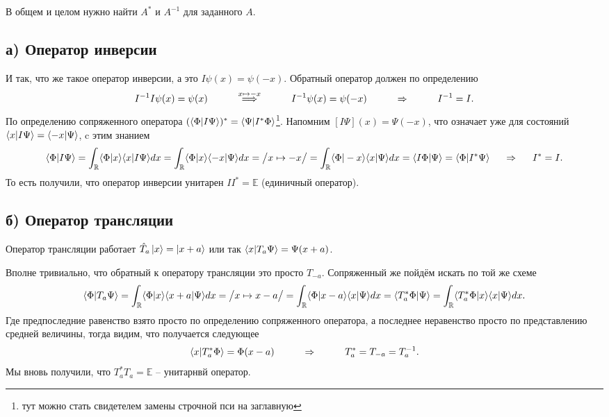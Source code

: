 В общем и целом нужно найти $A^*$ и $A^{-1}$ для заданного $A$. 
\subsection*{а) Оператор инверсии}
И так, что же такое оператор инверсии, а это $I \psi(x) = \psi(-x)$.
Обратный оператор должен по определению
\begin{equation*}
	I^{-1} I \psi(x) = \psi(x)
	\hspace{1 cm}
	\overset{x \mapsto -x}{\Longrightarrow}
	\hspace{1 cm}
	I^{-1} \psi(x) = \psi(-x)
	\hspace{1 cm}
	\Rightarrow
	\hspace{1 cm}
	I^{-1} = I.
\end{equation*}
По определению сопряженного оператора $(\bk{\Phi}{I \Psi})^* = \bk{\Psi}{I^* \Phi}$\footnote{тут можно стать свидетелем замены строчной пси на заглавную}.
Напомним
$[I\Psi](x) = \Psi(-x)$, что означает уже для состояний $\bk{x}{I \Psi} = \bk{- x}{\Psi}$, c этим знанием
\begin{equation*}
	\bk{\Phi}{I \Psi} = \int_{\mathbb{R}} \bk{\Phi}{x} \bk{x}{I \Psi} d x
	=
	\int_{\mathbb{R}} \bk{\Phi}{x}\bk{-x}{\Psi} d x =\big/ x \mapsto - x \big/ =  \int_{\mathbb{R}} \bk{\Phi}{- x}\bk{x}{\Psi} d x
	=
	\bk{I \Phi}{\Psi} = \bk{\Phi}{I^* \Psi}
	\hspace{0.5 cm}
	\Rightarrow
	\hspace{0.5 cm}
	I^{*} = I.
\end{equation*}
То есть получили, что оператор инверсии унитарен $I I^* = \mathbb{E}$ (единичный оператор).

\subsection*{б) Оператор трансляции}
Оператор трансляции работает $\hat{T}_a \left| x \right\rangle = \left| x+a \right\rangle$ или так $\bk{x}{T_a\Psi} = \Psi(x + a)$.

Вполне тривиально, что обратный к оператору трансляции это просто $T_{-a}$. Сопряженный же пойдём искать по той же схеме
\begin{equation*}
	\bk{\Phi}{T_a \Psi} = \int_{\mathbb{R}} \bk{\Phi}{x} \bk{x+a}{\Psi} d x 
	= 
	\big/ x \mapsto x - a\big/
	=
	\int_{\mathbb{R}} \bk{\Phi}{x-a} \bk{x}{\Psi} d x 
	=
	\bk{T_a^{*}\Phi}{\Psi}
	=
	\int_{\mathbb{R}} \bk{T_a^{*}\Phi}{x} \bk{x}{\Psi} d x. 
\end{equation*}
Где предпоследние равенство взято просто по определению сопряженного оператора, а последнее неравенство просто по представлению средней величины, тогда видим, что получается следующее
\begin{equation*}
	\bk{x}{T_a^* \Phi} = \Phi(x-a)
	\hspace{1 cm}
	\Rightarrow
	\hspace{1 cm}
	T_a^* = T_{-a} = T_a^{-1}.
\end{equation*}
Мы вновь получили, что $T_a^* T_a = \mathbb{E}$ -- унитарнвй оператор.